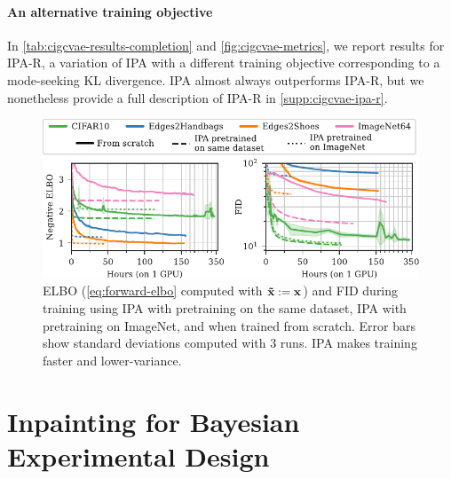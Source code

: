 \paragraph{An alternative training objective}
In \cref{tab:cigcvae-results-completion} and \cref{fig:cigcvae-metrics}, we report results for
IPA-R, a variation of IPA with a different training objective corresponding to a
mode-seeking KL divergence. IPA almost always outperforms IPA-R, but we
nonetheless provide a full description of IPA-R in \cref{supp:cigcvae-ipa-r}.

\begin{figure}[t]
  \vspace{-.1cm}
  \centering
  \includegraphics[scale=1]{figs/cigcvae/training-both}
  \caption{ELBO (\cref{eq:forward-elbo} computed with $\mathbf{\tilde{x}}{} := \mathbf{x}{}$) and
    FID during training using IPA with pretraining on the same dataset, IPA with
    pretraining on ImageNet, and when trained from scratch. Error bars show
    standard deviations computed with 3 runs. IPA makes training faster and
    lower-variance.}
  \label{fig:cigcvae-training}
  \vspace{-.3cm}
\end{figure}




\section{Inpainting for Bayesian Experimental Design} \label{sec:cigcvae-boed}

